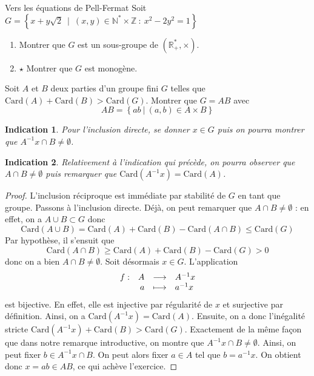 \documentclass[french,a4paper]{article}
\newcommand{\N}{\mathbb{N}}
\newcommand{\Z}{\mathbb{Z}}
\newcommand{\R}{\mathbb{R}}
\newcommand{\st}{^*}
\newcommand{\inv}{^{-1}}
\newcommand{\card}{\text{Card}}
\theoremstyle{plain}
\newtheorem*{ind}{Indication}
\theoremstyle{definition}
\theoremstyle{remark}
\begin{document}
\begin{ex}[Moulin.11]{Vers les équations de Pell-Fermat}
	Soit $G=\left\{x+y\sqrt{2}\ \mid \ (x,y)\in\N\st\times\Z\ : \ x^2-2y^2=1\right\}$
	\begin{enumerate}
		\item Montrer que $G$ est un sous-groupe de $(\R_+\st,\times)$.
		\item $\star$ Montrer que $G$ est monogène.
	\end{enumerate}
\end{ex}

\begin{ex}{}
	Soit $A$ et $B$ deux parties d'un groupe fini $G$ telles que $\card(A)+\card(B)>\card(G)$. Montrer que $G=AB$ avec $$AB=\left\{ab \ |\ (a,b)\in A\times B\right\}$$
\end{ex}

\begin{ind}
	Pour l'inclusion directe, se donner $x \in G$ puis on pourra montrer que $A\inv x \cap B \ne \emptyset$.
\end{ind}

\begin{ind}
	Relativement à l'indication qui précède, on pourra observer que $A\cap B \ne \emptyset$ puis remarquer que $\card(A\inv x) = \card(A)$.
\end{ind}

\begin{proof}
	L'inclusion réciproque est immédiate par stabilité de $G$ en tant que groupe. Passons à l'inclusion directe. Déjà, on peut remarquer que $A\cap B \ne \emptyset$ : en effet, on a $A\cup B \subset G$ donc $$\card(A\cup B)=\card(A)+\card(B)-\card(A\cap B) \leqslant\card(G)$$ Par hypothèse, il s'ensuit que $$\card(A\cap B) \geqslant \card(A)+\card(B)-\card(G)>0$$ donc on a bien $A\cap B \ne \emptyset$. Soit désormais $x \in G$. L'application $$
	\begin{array}[t]{lrcl}
		f : & A & \longrightarrow & A\inv x \\
		& a & \longmapsto & a\inv x
	\end{array}
	$$ est bijective. En effet, elle est injective par régularité de $x$ et surjective par définition. Ainsi, on a $\card(A\inv x)=\card(A)$. Ensuite, on a donc l'inégalité stricte $\card(A\inv x)+\card(B) > \card(G)$. Exactement de la même façon que dans notre remarque introductive, on montre que $A\inv x \cap B \ne \emptyset$. Ainsi, on peut fixer $b \in A\inv x \cap B$. On peut alors fixer $a \in A$ tel que $b=a\inv x$. On obtient donc $x=ab \in AB$, ce qui achève l'exercice.
\end{proof}
\end{document}
